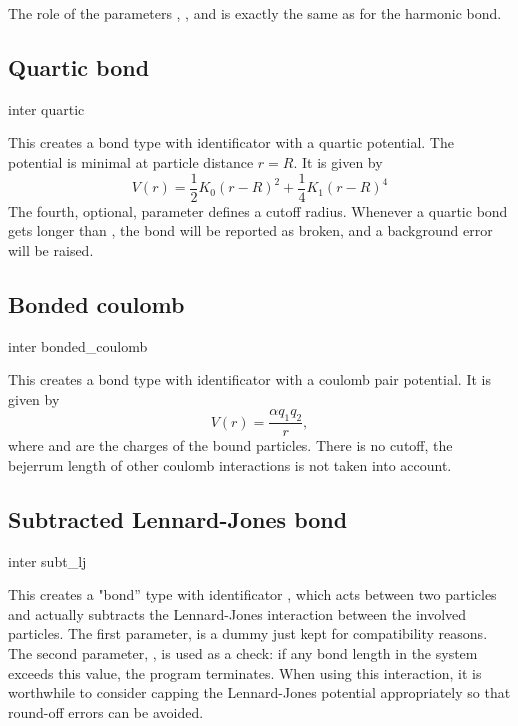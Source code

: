 The role of the parameters , , and
 is exactly the same as for the harmonic bond.

\subsection{Quartic bond}

\begin{essyntax}
  inter 
  quartic    
\end{essyntax}
This creates a bond type with identificator  with a
quartic potential. The potential is minimal at particle distance $r=R$.
It is given by
\begin{equation}
  V(r) = \frac{1}{2} K_0 \left( r - R \right)^2 + \frac{1}{4} K_1 \left( r - R \right)^4
\end{equation}
The fourth, optional, parameter  defines a cutoff
radius.  Whenever a quartic bond gets longer than
, the bond will be reported as broken, and a
background error will be raised.

\subsection{Bonded coulomb}

\begin{essyntax}
  inter 
  bonded_coulomb \var{\alpha}
\end{essyntax}
This creates a bond type with identificator  with a
coulomb pair potential.
It is given by
\begin{equation}
  V(r) = \frac{\alpha q_1 q_2}{r},
\end{equation}
where  and  are the charges of the bound particles.
There is no cutoff, the bejerrum length of other coulomb interactions
is not taken into account.

\subsection{Subtracted Lennard-Jones bond}

\begin{essyntax}
  inter 
  subt_lj
   
\end{essyntax}
This creates a "bond'' type with identificator , which
acts between two particles and actually subtracts the Lennard-Jones interaction
between the involved particles.  The first parameter,  is a dummy
just kept for compatibility reasons. The second parameter, , is used as a
check: if any bond length in the system exceeds this value, the program
terminates. When using this interaction, it is worthwhile to consider
capping the Lennard-Jones potential appropriately so that round-off errors can
be avoided.


